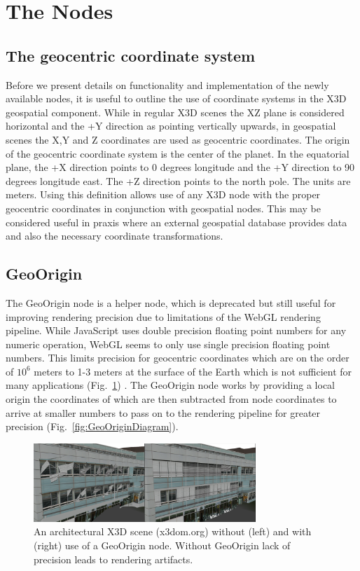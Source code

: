 \documentclass[review]{acmsiggraph}            %
\begin{document}
\section{The Nodes}

\subsection{The geocentric coordinate system}

Before we present details on functionality and implementation of the newly available nodes, it is
useful to outline the use of coordinate systems in the X3D geospatial component. While in regular
X3D scenes the XZ plane is considered horizontal and the +Y direction as pointing vertically
upwards, in geospatial scenes the X,Y and Z coordinates are used as geocentric coordinates. The
origin of the geocentric coordinate system is the center of the planet. 
In the equatorial plane, the +X direction points to 0 degrees longitude
and the +Y direction to 90 degrees longitude east. The +Z direction points
to the north pole.
The units are meters. Using this definition allows use of any X3D node with
the proper geocentric coordinates in conjunction with geospatial nodes. This may be considered
useful in praxis where an external geospatial database provides data and also the necessary
coordinate transformations.

\subsection{GeoOrigin}

The GeoOrigin node is a helper node, which is deprecated but still useful for improving rendering
precision due to limitations of the WebGL rendering pipeline. While JavaScript uses double precision
floating point numbers for any numeric operation, WebGL seems to only use single precision floating
point numbers. This limits precision for geocentric coordinates which are on the order of $10^{6}$
meters to 1-3 meters at the surface of the Earth which is not sufficient for many applications
(Fig.~\ref{fig:GeoOriginImage}) \cite{thorne05}. The GeoOrigin node works by providing a local origin the
coordinates of which are then subtracted from node coordinates to arrive at smaller numbers to pass
on to the rendering pipeline for greater precision (Fig.~\ref{fig:GeoOriginDiagram}).

\begin{figure}[htbp] \centering \includegraphics[width=3.3in]{GeoOriginImage.png} \caption{An
  architectural X3D scene (x3dom.org) without (left) and with (right) use of a GeoOrigin node.
Without GeoOrigin lack of precision leads to rendering artifacts.} \label{fig:GeoOriginImage}
\end{figure}
\end{document}
